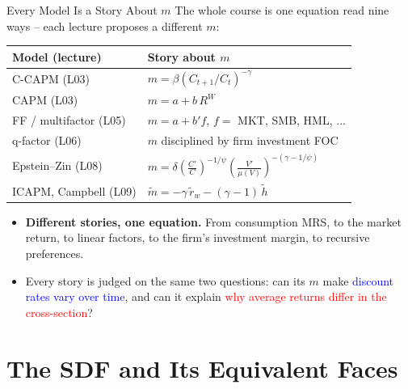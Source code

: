 \documentclass{beamer}
\newcommand{\tld}[1]{\widetilde{#1}}
\begin{document}
\begin{frame}{Every Model Is a Story About $m$}
\justifying
The whole course is one equation read nine ways -- each lecture proposes a different $m$:
\begin{center}\footnotesize
\begin{tabular}{@{}ll@{}}
\toprule
\textbf{Model (lecture)} & \textbf{Story about $m$} \\
\midrule
C-CAPM (L03) & $m=\beta\!\left(C_{t+1}/C_t\right)^{-\gamma}$ \\
CAPM (L03) & $m = a + b\,R^{W}$ \\
FF / multifactor (L05) & $m = a + b'f$,\; $f=$ MKT, SMB, HML, $\dots$ \\
q-factor (L06) & $m$ disciplined by firm investment FOC \\
Epstein--Zin (L08) & $m=\delta\!\left(\tfrac{C'}{C}\right)^{-1/\psi}\!\!\left(\tfrac{V'}{\mu(V)}\right)^{-(\gamma-1/\psi)}$ \\
ICAPM, Campbell (L09) & $\tld{m}=-\gamma\,\tld{r}_w-(\gamma-1)\,\tld{h}$ \\
\bottomrule
\end{tabular}
\end{center}
\smallskip
\begin{itemize}
  \item \textbf{Different stories, one equation.} From consumption MRS, to the market return, to linear factors, to the firm's investment margin, to recursive preferences.
  \item Every story is judged on the \alert{same two questions}: can its $m$ make \textcolor{blue}{discount rates vary over time}, and can it explain \textcolor{red}{why average returns differ in the cross-section}?
\end{itemize}
\end{frame}

\section{The SDF and Its Equivalent Faces}
\end{document}
